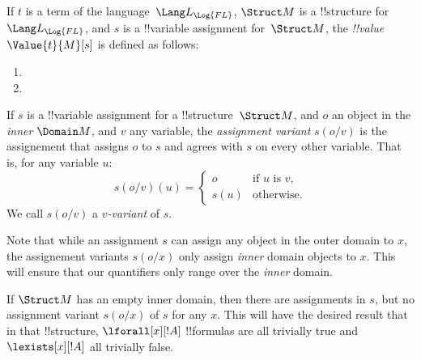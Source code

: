 \documentclass[../../../include/open-logic-section]{subfiles}
\begin{document}
\begin{defn}
If $t$ is a term of the language~$\Lang L_{\Log{FL}}$, $\Struct M$ is a
!!{structure} for~$\Lang L_{\Log{FL}}$, and $s$ is a !!{variable} assignment
for~$\Struct M$, the \emph{!!{value}}~$\Value{t}{M}[s]$ is defined as
follows:
\begin{enumerate}
\item {}
\item {}
\end{enumerate}
\end{defn}

\begin{defn}
  If $s$ is a !!{variable} assignment for a !!{structure}~$\Struct M$,
  and $o$ an object in the \emph{inner} $\Domain M$, and $v$ any variable, the
  \emph{assignment variant} $s(o/v)$ is the assignement that assigns $o$
  to $s$ and agrees with $s$ on every other variable. That is, for any
  variable $u$:
  $$
  s(o/v)(u)=\begin{cases}
    o & \text{if $u$ is $v$},\\
    s(u) & \text{otherwise}.  
  \end{cases}
  $$
  We call $s(o/v)$ a \emph{$v$-variant} of $s$.
\end{defn}

\begin{explain}
Note that while an assignment $s$ can assign any object in the outer 
domain to $x$, the assignement variants $s(o/x)$ only assign
\emph{inner} domain objects to $x$. This will ensure that our 
quantifiers only range over the \emph{inner} domain. 

If $\Struct M$ has an empty inner domain, then there are assignments
in $s$, but no assignment variant $s(o/x)$ of $s$ for any $x$. This
will have the desired result that in that !!{structure},
$\lforall[x][!A]$ !!{formula}s are all trivially true and
$\lexists[x][!A]$ all trivially false. 
\end{explain}
\end{document}
